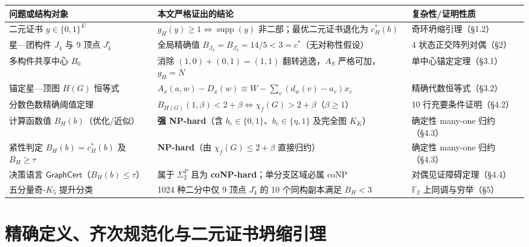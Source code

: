 \documentclass[11pt,a4paper]{ctexart}
\theoremstyle{definition}
\newcommand{\GraphCert}{\mathsf{GraphCert}}
\newcommand{\FF}{\mathbb F}
\newcommand{\1}{\boldsymbol 1}
\newcommand{\0}{\boldsymbol 0}
\newcommand{\chif}{\chi_f}
\begin{document}
\vspace{2mm}
\begin{center}
\small
\begin{tabularx}{\linewidth}{@{}p{.31\linewidth}X p{.22\linewidth}@{}}
\toprule
问题或结构对象 & 本文严格证出的结论 & 复杂性/证明性质 \\
\midrule
二元证书 $y\in\{0,1\}^E$ & $g_H(y)\ge 1\iff \operatorname{supp}(y)$ 非二部；最优二元证书退化为 $c_H^*(b)$ & 奇环坍缩引理（§1.2） \\
星—团构件 $J_4$ 与 9 顶点 $J_4^\circ$ & 全局精确值 $\boxed{B_{J_4}=B_{J_4^\circ}=14/5<3=c^*}$（无对称性假设） & 4 状态正交阵列对偶（§2） \\
多构件共享中心 $B_0$ & 消除 $(1,0)+(0,1)=(1,1)$ 翻转逃逸，$A_S$ 严格可加，$g_H=N$ & 单中心锚定定理（§3.1） \\
锚定星—顶图 $H(G)$ 恒等式 & $A_x(a,w)-D_x(w)\equiv W-\sum_{v}(d_w(v)-a_v)x_v$ & 精确代数恒等式（§3.2） \\
分数色数精确阈值定理 & $\boxed{B_{H(G)}(1,\beta)<2+\beta \iff \chif(G)>2+\beta}$（$\beta\ge 1$） & 10 行充要条件证明（§4.2） \\
计算函数值 $B_H(b)$（优化/近似） & \textbf{强 NP-hard}（含 $b_e\in\{0,1\}$、$b_e\in\{\eta,1\}$ 及完全图 $K_K$） & 确定性 many-one 归约（§4.3） \\
紧性判定 $B_H(b)=c_H^*(b)$ 及 $B_H\ge\tau$ & \textbf{NP-hard}（由 $\chif(G)\le 2+\beta$ 直接归约） & 确定性 many-one 归约（§4.3） \\
决策语言 $\GraphCert$（$B_H(b)\le\tau$） & 属于 $\Sigma_2^P$ 且为 \textbf{coNP-hard}；单分支区域必属 $\mathrm{coNP}$ & 对偶见证障碍定理（§4.4） \\
五分量奇-$K_5$ 提升分类 & 1024 种二分中仅 9 顶点 $J_4^\circ$ 的 10 个同构副本满足 $B_H<3$ & $\FF_2$ 上同调与穷举（§5） \\
\bottomrule
\end{tabularx}
\end{center}

\newpage
\tableofcontents
\newpage

\section{精确定义、齐次规范化与二元证书坍缩引理}
\end{document}
